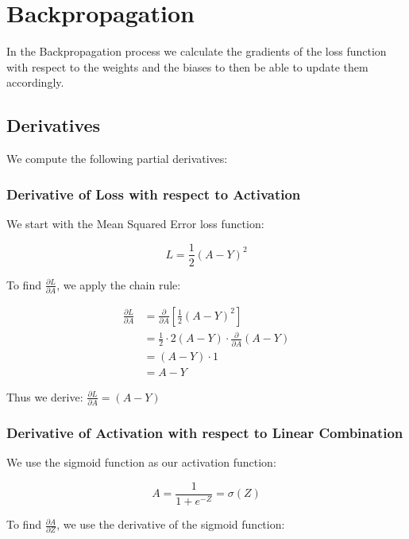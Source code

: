 \documentclass{article}
\begin{document}
\section{Backpropagation}

In the Backpropagation process we calculate the gradients of the loss function with respect to the weights and the biases to then be able to update them accordingly.

\subsection{Derivatives}

We compute the following partial derivatives:

\subsubsection{Derivative of Loss with respect to Activation}

We start with the Mean Squared Error loss function:

\begin{equation}
    L = \frac{1}{2}(A - Y)^2
\end{equation}

To find $\frac{\partial L}{\partial A}$, we apply the chain rule:

\begin{align}
    \frac{\partial L}{\partial A} &= \frac{\partial}{\partial A} [\frac{1}{2}(A - Y)^2] \\
    &= \frac{1}{2} \cdot 2(A - Y) \cdot \frac{\partial}{\partial A}(A - Y) \\
    &= (A - Y) \cdot 1 \\
    &= A - Y
\end{align}

Thus we derive: $\frac{\partial L}{\partial A} = (A - Y)$

\subsubsection{Derivative of Activation with respect to Linear Combination}

We use the sigmoid function as our activation function:

\begin{equation}
    A = \frac{1}{1 + e^{-Z}} = \sigma(Z)
\end{equation}

To find $\frac{\partial A}{\partial Z}$, we use the derivative of the sigmoid function:
\end{document}
